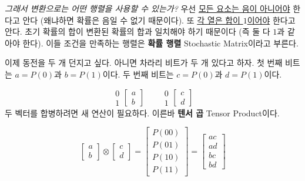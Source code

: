 \documentclass[a4paper,chapter,atbegshi,hidelinks]{oblivoir}
\begin{document}
\emph{그래서 변환으로는 어떤 행렬을 사용할 수 있는가?} 우선 \underline{모든
요소는 음이 아니어야} 한다고 안다 (왜냐하면 확률은 음일 수 없기
때문이다). 또 \underline{각 열은 합이 $1$이어야} 한다고 안다. 초기
확률의 합이 변환된 확률의 합과 일치해야 하기 때문이다 (즉 둘 다
$1$과 같아야 한다). 이들 조건을 만족하는 행렬은 \textbf{확률 행렬}{\footnotesize
Stochastic Matrix}이라고 부른다. 

이제 동전을 두 개 던지고 싶다. 아니면 차라리 비트가 두 개 있다고 하자. 
첫 번째 비트는 $a = P(0)$과 $b = P(1)$이다. 두 번째 비트는 $c = P(0)$과
$d = P(1)$이다.

\[
  \begin{matrix}{\scriptstyle0} \\ {\scriptstyle1} \end{matrix}
  \begin{bmatrix}a \\ b\end{bmatrix}\quad\quad
  \begin{matrix}{\scriptstyle0} \\ {\scriptstyle1} \end{matrix}
  \begin{bmatrix}c \\ d\end{bmatrix}
\]
두 벡터를 합병하려면 새 연산이 필요하다. 이른바 \textbf{텐서 곱}{\footnotesize
Tensor Product}이다.

\begin{equation}
  \begin{bmatrix}a\\b\end{bmatrix} \otimes \begin{bmatrix}c\\d\end{bmatrix} =
  \begin{bmatrix}P(00)\\P(01)\\P(10)\\P(11)\end{bmatrix} = 
  \begin{bmatrix}ac\\ad\\bc\\bd\end{bmatrix}
\end{equation}
\end{document}
